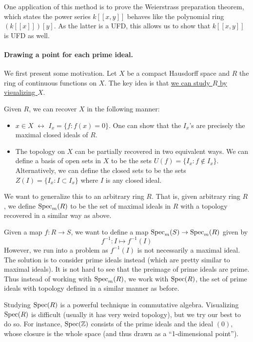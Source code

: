 One application of this method is to prove the Weierstrass preparation theorem, which states the power series $k[[x,y]]$ behaves like the polynomial ring $(k[[x]])[y]$. As the latter is a UFD, this allows us to show that $k[[x,y]]$ is UFD as well.

\paragraph{Drawing a point for each prime ideal.} We first present some motivation. Let $X$ be a compact Hausdorff space and $R$ the ring of continuous functions on $X$. The key idea is that \underline{we can study $R$ by visualizing $X$}.

Given $R$, we can recover $X$ in the following manner:
\begin{itemize}
    \item $x \in X$ $\longleftrightarrow$ $I_x = \{f : f(x) = 0\}$. One can show that the $I_x$'s are precisely the maximal closed ideals of $R$.
    \item The topology on $X$ can be partially recovered in two equivalent ways. We can define a basis of open sets in $X$ to be the sets $U(f) = \{I_x : f \not \in I_x\}$. Alternatively, we can define the closed sets to be the sets $Z(I) = \{I_x : I \subset I_x\}$ where $I$ is any closed ideal.
\end{itemize}
We want to generalize this to an arbitrary ring $R$. That is, given arbitrary ring $R$, we define $\operatorname{Spec}_m(R)$ to be the set of maximal ideals in $R$ with a topology recovered in a similar way as above.

Given a map $f: R \to S$, we want to define a map $\operatorname{Spec}_m(S) \to \operatorname{Spec}_m(R)$ given by
\[
    f^{-1}: I \mapsto f^{-1}(I)
\]
However, we run into a problem as $f^{-1}(I)$ is not necessarily a maximal ideal. The solution is to consider prime ideals instead (which are pretty similar to maximal ideals). It is not hard to see that the preimage of prime ideals are prime. Thus instead of working with $\operatorname{Spec}_m(R)$, we work with $\operatorname{Spec}(R)$, the set of prime ideals with topology defined in a similar manner as before.

Studying $\operatorname{Spec}(R)$ is a powerful technique in commutative algebra. Visualizing $\operatorname{Spec}(R)$ is difficult (usually it has very weird topology), but we try our best to do so. For instance, $\operatorname{Spec}({\mathbb Z})$ consists of the prime ideals and the ideal $(0)$, whose closure is the whole space (and thus drawn as a ``1-dimensional point'').



